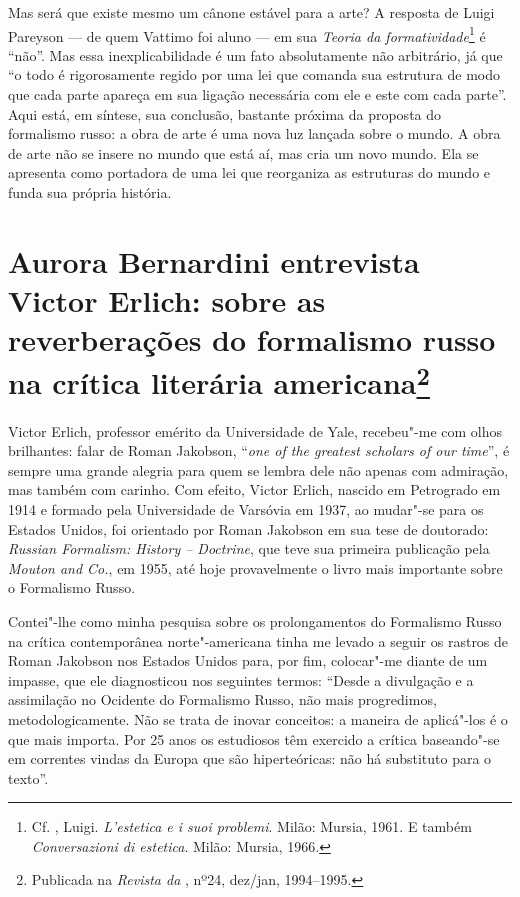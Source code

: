 {Mas será que existe mesmo um cânone estável para a arte? A resposta de
Luigi Pareyson --- de quem Vattimo foi aluno
 --- em sua \emph{Teoria da formatividade}\footnote{Cf. , Luigi. 
\emph{L'estetica e i suoi problemi}. Milão: Mursia,
 1961. E também \emph{Conversazioni di estetica}. Milão: Mursia, 1966.}
 é ``não''. Mas essa inexplicabilidade é
um fato absolutamente não arbitrário, já que ``o todo é rigorosamente
regido por uma lei que comanda sua estrutura de modo que cada parte
apareça em sua ligação necessária com ele e este com cada parte''. Aqui
está, em síntese, sua conclusão, bastante próxima da proposta do
formalismo russo: a obra de arte é uma nova luz lançada sobre o mundo. A
obra de arte não se insere no mundo que está aí, mas cria um novo mundo.
Ela se apresenta como portadora de uma lei que reorganiza as estruturas
do mundo e funda sua própria história.

\chapter*{Aurora Bernardini entrevista Victor Erlich: sobre as reverberações do formalismo russo na crítica literária americana\footnote{Publicada na \emph{Revista da }, nº24, dez/jan, 1994--1995.}}


Victor Erlich, professor emérito da Universidade de Yale, recebeu"-me com
olhos brilhantes: falar de Roman Jakobson, ``\emph{one of the greatest
scholars of our time}'', é sempre uma grande alegria para quem se lembra
dele não apenas com admiração, mas também com carinho.
Com efeito, Victor Erlich, nascido em Petrogrado em 1914 e formado pela
Universidade de Varsóvia em 1937, ao mudar"-se para os Estados Unidos, foi
orientado por Roman Jakobson em sua tese de doutorado: \emph{Russian
Formalism: History -- Doctrine}, que teve sua primeira publicação
pela \emph{Mouton and Co.}, em 1955, até hoje provavelmente o livro
mais importante sobre o Formalismo Russo.

Contei"-lhe como minha pesquisa sobre os prolongamentos do Formalismo
Russo na crítica contemporânea norte"-americana tinha me levado
 a seguir os rastros de Roman Jakobson nos Estados Unidos para,
por fim, colocar"-me diante de um impasse, que ele diagnosticou nos seguintes
termos: ``Desde a divulgação e a assimilação no Ocidente do Formalismo
Russo, não mais progredimos, metodologicamente. Não se trata de inovar
conceitos: a maneira de aplicá"-los é o que mais importa. Por 25 anos os
estudiosos têm exercido a crítica baseando"-se em correntes vindas da
Europa que são hiperteóricas: não há substituto para o texto''.

}
